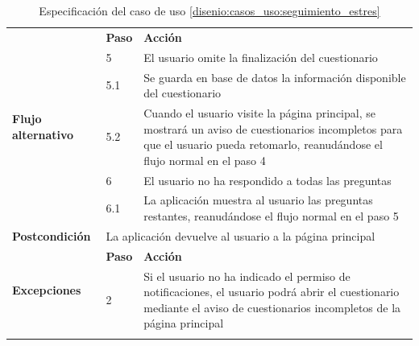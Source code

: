 \begin{table}[h]
\begin{tabularx}{\textwidth}{|l|l|X|}
                    \hline
                    \multirow{6}{*}{\textbf{Flujo alternativo}} & \textbf{Paso} & \textbf{Acción} \\
                    \cline{2-3} & 5 & El usuario omite la finalización del cuestionario \\
                    \cline{2-3} & 5.1 & Se guarda en base de datos la información disponible del cuestionario \\
                    \cline{2-3} & 5.2 & Cuando el usuario visite la página principal, se mostrará un aviso de cuestionarios incompletos para que el usuario pueda retomarlo, reanudándose el flujo normal en el paso 4 \\
                    \cline{2-3} & 6 & El usuario no ha respondido a todas las preguntas \\
                    \cline{2-3} & 6.1 & La aplicación muestra al usuario las preguntas restantes, reanudándose el flujo normal en el paso 5 \\
                    \hline
                    \textbf{Postcondición} & \multicolumn{2}{|X|}{La aplicación devuelve al usuario a la página principal} \\
                    \hline
                    \multirow{2}{*}{\textbf{Excepciones}}  & \textbf{Paso} & \textbf{Acción} \\
                    \cline{2-3} & 2 & Si el usuario no ha indicado el permiso de notificaciones, el usuario podrá abrir el cuestionario mediante el aviso de cuestionarios incompletos de la página principal \\
                    \hline
                    \caption{Especificación del caso de uso \ref{disenio:casos_uso:seguimiento_estres}}
                    \label{tabla:casos_uso:seguimiento_estres}
                \end{tabularx}
            \end{table}

